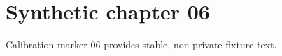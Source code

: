 \chapter{Synthetic chapter 06}\label{chap:06}
Calibration marker 06 provides stable, non-private fixture text.
